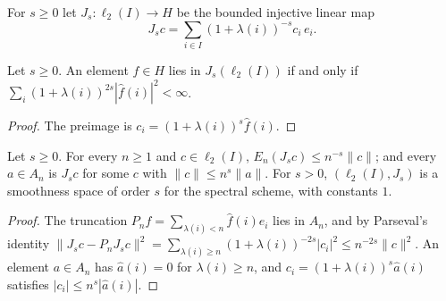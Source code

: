 \begin{definition}
\label{def:sobolev-embed}
\leanok
{}
For $s \geq 0$ let $J_s : \ell_2(I) \to H$ be the bounded injective linear map
\[
  J_s c = \sum_{i \in I} (1 + \lambda(i))^{-s} c_i \, e_i .
\]
\end{definition}

\begin{lemma}
\label{lem:sobolev-range}
\leanok
{}
Let $s \geq 0$. An element $f \in H$ lies in $J_s(\ell_2(I))$ if and only if
$\sum_i (1 + \lambda(i))^{2s} |\hat f(i)|^2 < \infty$.
\end{lemma}

\begin{proof}
\leanok
The preimage is $c_i = (1 + \lambda(i))^s \hat f(i)$.
\end{proof}

\begin{proposition}
\label{prop:spectral-jackson-bernstein}
\leanok
{}
Let $s \geq 0$. For every $n \geq 1$ and $c \in \ell_2(I)$, $E_n(J_s c) \leq n^{-s} \|c\|$;
and every $a \in A_n$ is $J_s c$ for some $c$ with $\|c\| \leq n^s \|a\|$. For $s > 0$,
$(\ell_2(I), J_s)$ is a smoothness space of order $s$ for the spectral scheme, with
constants $1$.
\end{proposition}

\begin{proof}
\leanok
The truncation $P_n f = \sum_{\lambda(i) < n} \hat f(i) e_i$ lies in $A_n$, and by
Parseval's identity $\|J_s c - P_n J_s c\|^2 = \sum_{\lambda(i) \geq n} (1 +
\lambda(i))^{-2s} |c_i|^2 \leq n^{-2s} \|c\|^2$. An element $a \in A_n$ has $\hat a(i) = 0$
for $\lambda(i) \geq n$, and $c_i = (1 + \lambda(i))^s \hat a(i)$ satisfies
$|c_i| \leq n^s |\hat a(i)|$.
\end{proof}

